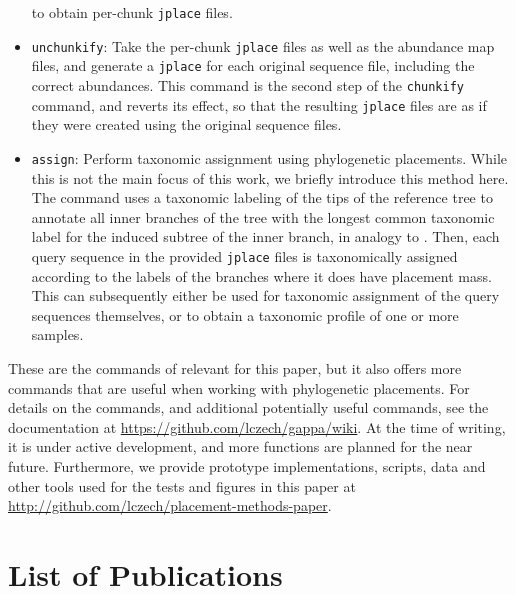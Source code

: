 \begin{itemize}
          to obtain per-chunk \texttt{jplace} files.
    \item \texttt{unchunkify}: Take the per-chunk \texttt{jplace} files as well as the abundance map files,
          and generate a \texttt{jplace} for each original sequence file, including the correct abundances.
          This command is the second step of the \texttt{chunkify} command, and reverts its effect,
          so that the resulting \texttt{jplace} files are as if they were created using the original sequence files.
    \item \texttt{assign}: Perform taxonomic assignment using phylogenetic placements.
          While this is not the main focus of this work, we briefly introduce this method here.
          The command uses a taxonomic labeling of the tips of the reference tree
          to annotate all inner branches of the tree with the longest common taxonomic label
          for the induced subtree of the inner branch, in analogy to  \citep{Kozlov2016}.
          Then, each query sequence in the provided \texttt{jplace} files
          is taxonomically assigned according to the labels of the branches where it does have placement mass.
          This can subsequently either be used for taxonomic assignment of the query sequences themselves,
          or to obtain a taxonomic profile of one or more samples.
\end{itemize}

These are the commands of  relevant for this paper,
but it also offers more commands that are useful when working with phylogenetic placements.
For details on the commands, and additional potentially useful commands,
see the  documentation at \url{https://github.com/lczech/gappa/wiki}.
At the time of writing, it is under active development, and more functions are planned for the near future.
Furthermore, we provide prototype implementations, scripts, data and other tools
used for the tests and figures in this paper at \url{http://github.com/lczech/placement-methods-paper}.


\cleardoublepage

\chapter{List of Publications}
\label{ch:Publications}


